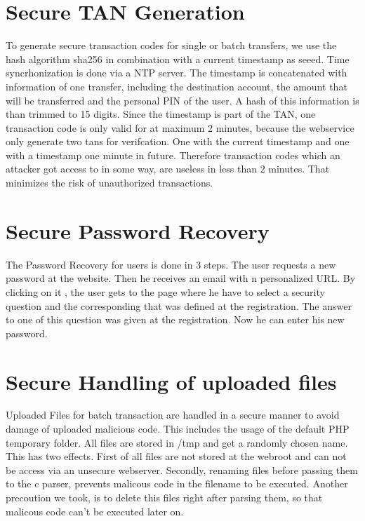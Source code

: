 \section{Secure TAN Generation}
To generate secure transaction codes for single or batch transfers, we use the hash algorithm sha256 in combination with a current timestamp as seeed. Time syncrhonization is done via a NTP server. The timestamp is concatenated with information of one transfer, including the destination account, the amount that will be transferred and the personal PIN of the user. A hash of this information is than trimmed to 15 digits. 
Since the timestamp is part of the TAN, one transaction code is only valid for at maximum 2 minutes, because the webservice only generate two tans for verifcation. One with the current timestamp and one with a timestamp one minute in future. Therefore transaction codes which an attacker got access to in some way, are useless in less than 2 minutes. That minimizes the risk of unauthorized transactions.
\section{Secure Password Recovery}
The Password Recovery for users is done in 3 steps. The user requests a new password at the website. Then he receives an email with n personalized URL. By clicking on it , the user gets to the page where he have to select a security question and the corresponding that was defined at the registration. The answer to one of this question was given at the registration. Now he can enter his new password.
\section{Secure Handling of uploaded files}
Uploaded Files for batch transaction are handled in a secure manner to avoid damage of uploaded malicious code. This includes the usage of the default PHP temporary folder. All files are stored in /tmp and get a randomly chosen name. This has two effects. First of all files are not stored at the webroot and can not be access via an unsecure webserver. Secondly, renaming files before passing them to the c parser, prevents malicous code in the filename to be executed.
\newline
Another precoution we took, is to delete this files right after parsing them, so that malicous code can't be executed later on. 



